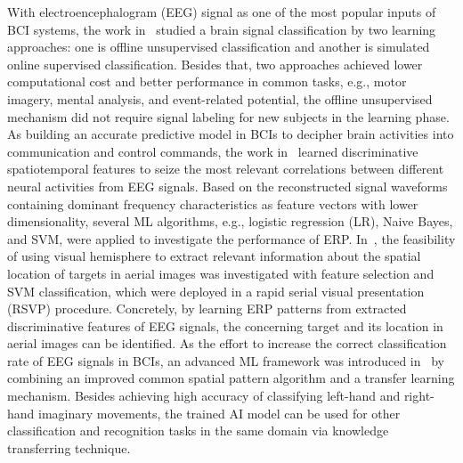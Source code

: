 \documentclass[journal]{IEEEtran}
\begin{document}
With electroencephalogram (EEG) signal as one of the most popular inputs of BCI systems, the work in~\cite{he2020transfer} studied a brain signal classification by two learning approaches: one is offline unsupervised classification and another is simulated online supervised classification. Besides that, two approaches achieved lower computational cost and better performance in common tasks, e.g., motor imagery, mental analysis, and event-related potential, the offline unsupervised mechanism did not require signal labeling for new subjects in the learning phase.
As building an accurate predictive model in BCIs to decipher brain activities into communication and control commands, the work in~\cite{abibullaev2019learning} learned discriminative spatiotemporal features to seize the most relevant correlations between different neural activities from EEG signals. Based on the reconstructed signal waveforms containing dominant frequency characteristics as feature vectors with lower dimensionality, several ML algorithms, e.g., logistic regression (LR), Naive Bayes, and SVM, were applied to investigate the performance of ERP.
In~\cite{matran2016brain}, the feasibility of using visual hemisphere to extract relevant information about the spatial location of targets in aerial images was investigated with feature selection and SVM classification, which were deployed in a rapid serial visual presentation (RSVP) procedure. Concretely, by learning ERP patterns from extracted discriminative features of EEG signals, the concerning target and its location in aerial images can be identified.
As the effort to increase the correct classification rate of EEG signals in BCIs, an advanced ML framework was introduced in~\cite{lv2021advanced} by combining an improved common spatial pattern algorithm and a transfer learning mechanism. Besides achieving high accuracy of classifying left-hand and right-hand imaginary movements, the trained AI model can be used for other classification and recognition tasks in the same domain via knowledge transferring technique.
\end{document}
